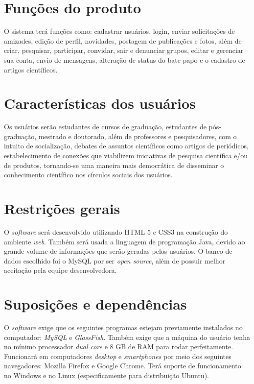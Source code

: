 \section{Funções do produto}

O sistema terá funções como: cadastrar usuários, login, enviar solicitações de amizades, edição de perfil, novidades, postagem de publicações e fotos, além de criar, pesquisar, participar, convidar, sair e denunciar grupos, editar e gerenciar sua conta, envio de mensagens, alteração de status do bate papo e o cadastro de artigos científicos.

\section{Características dos usuários}
Os usuários serão estudantes de cursos de graduação, estudantes de pós-graduação, mestrado e doutorado, além de professores e pesquisadores, com o intuito de socialização, debates de assuntos científicos como artigos de periódicos, estabelecimento de conexões que viabilizem iniciativas de pesquisa científica e/ou de produtos, tornando-se uma maneira mais democrática de disseminar o conhecimento científico nos círculos sociais dos usuários.


\section{Restrições gerais}
O \textit{software} será desenvolvido utilizando HTML 5 e CSS3 na construção do ambiente \textit{web}. Também será usada a linguagem de programação Java, devido ao grande volume de informações que serão geradas pelos usuários. O banco de dados escolhido foi o MySQL por ser \textit{open source}, além de possuir melhor aceitação pela equipe desenvolvedora.

\section{Suposições e dependências}
O \textit{software} exige que os seguintes programas estejam previamente instalados no computador: \textit{MySQL} e \textit{GlassFish}. Também exige que a máquina do usuário tenha no mínimo processador \textit{dual core} e 8 GB de RAM para rodar perfeitamente. Funcionará em computadores \textit{desktop} e \textit{smartphones} por meio dos seguintes navegadores: Mozilla Firefox e Google Chrome. Terá suporte de funcionamento no Windows e no Linux (especificamente para distribuição Ubuntu).